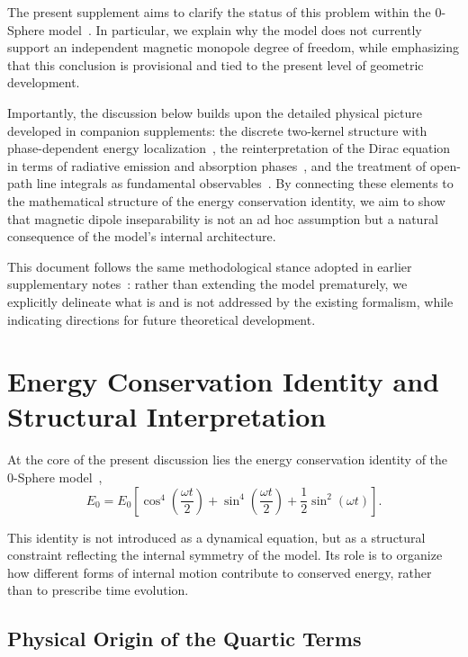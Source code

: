 \documentclass[12pt,letterpaper]{article}
\begin{document}
The present supplement aims to clarify the status of this problem within the 0-Sphere model~\cite{hanamura16759284,hanamura18603340}. In particular, we explain why the model does not currently support an independent magnetic monopole degree of freedom, while emphasizing that this conclusion is provisional and tied to the present level of geometric development.

Importantly, the discussion below builds upon the detailed physical picture developed in companion supplements: the discrete two-kernel structure with phase-dependent energy localization~\cite{hanamura18356895,hanamura18511664}, the reinterpretation of the Dirac equation in terms of radiative emission and absorption phases~\cite{hanamura17760132}, and the treatment of open-path line integrals as fundamental observables~\cite{hanamura18067760,hanamura18135855,hanamura18203433}. By connecting these elements to the mathematical structure of the energy conservation identity, we aim to show that magnetic dipole inseparability is not an ad hoc assumption but a natural consequence of the model's internal architecture.

This document follows the same methodological stance adopted in earlier supplementary notes~\cite{hanamura18603340}: rather than extending the model prematurely, we explicitly delineate what is and is not addressed by the existing formalism, while indicating directions for future theoretical development.


\section{Energy Conservation Identity and Structural Interpretation}

At the core of the present discussion lies the energy conservation identity of the 0-Sphere model~\cite{hanamura16759284,hanamura17765017},
\begin{equation}
E_0 = E_0 \left[
\cos^4\!\left(\frac{\omega t}{2}\right)
+ \sin^4\!\left(\frac{\omega t}{2}\right)
+ \frac{1}{2}\sin^2(\omega t)
\right].
\label{eq:energy_identity}
\end{equation}

This identity is not introduced as a dynamical equation, but as a structural constraint reflecting the internal symmetry of the model. Its role is to organize how different forms of internal motion contribute to conserved energy, rather than to prescribe time evolution.

\subsection{Physical Origin of the Quartic Terms}
\end{document}
